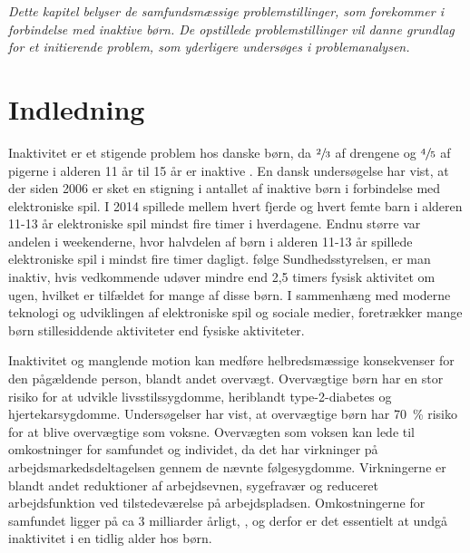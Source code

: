 \textit{Dette kapitel belyser de samfundsmæssige problemstillinger, som forekommer i forbindelse med inaktive børn. De opstillede problemstillinger vil danne grundlag for et initierende problem, som yderligere undersøges i problemanalysen.}

\section{Indledning}
Inaktivitet er et stigende problem hos danske børn, da $\sfrac{2}{3}$ af drengene og $\sfrac{4}{5}$ af pigerne i alderen 11 år til 15 år er inaktive \citep{SundhedsstyrrelsenFaktaark}. %
En dansk undersøgelse har vist, at der siden 2006 er sket en stigning i antallet af inaktive børn i forbindelse med elektroniske spil. I 2014 spillede mellem hvert fjerde og hvert femte barn i alderen 11-13 år elektroniske spil mindst fire timer i hverdagene. Endnu større var andelen i weekenderne, hvor halvdelen af børn i alderen 11-13 år spillede elektroniske spil i mindst fire timer dagligt. \citep{Universitet2014} følge Sundhedsstyrelsen, er man inaktiv, hvis vedkommende udøver mindre end 2,5 timers fysisk aktivitet om ugen\citep{Kiens2007}, hvilket er tilfældet for mange af disse børn.  I sammenhæng med moderne teknologi  og udviklingen af elektroniske spil og sociale medier, foretrækker mange børn stillesiddende aktiviteter end fysiske aktiviteter.\citep{Universitet2014}	

Inaktivitet og manglende motion kan medføre helbredsmæssige konsekvenser for den pågældende person, blandt andet overvægt. Overvægtige børn har en stor risiko for at udvikle livsstilssygdomme, heriblandt type-2-diabetes og hjertekarsygdomme. Undersøgelser har vist, at overvægtige børn har 70~\% risiko for at blive overvægtige som voksne. \citep{Reilly2006} 
Overvægten som voksen kan lede til omkostninger for samfundet og individet, da det har virkninger på arbejdsmarkedsdeltagelsen gennem de nævnte følgesygdomme. Virkningerne er blandt andet reduktioner af arbejdsevnen, sygefravær og reduceret arbejdsfunktion ved tilstedeværelse på arbejdspladsen. Omkostningerne for samfundet ligger på ca 3 milliarder årligt, \citep{BarudThomsen2007}, \citep{Sundhedsministeriet2007} og derfor er det essentielt at undgå inaktivitet i en tidlig alder hos børn.

